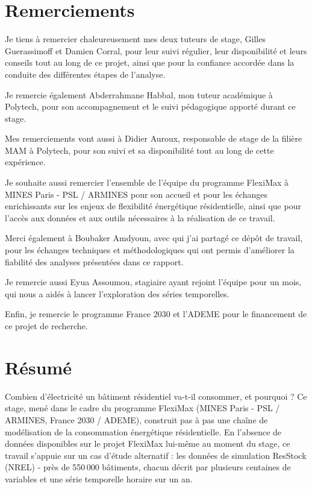 \chapter*{Remerciements}

Je tiens à remercier chaleureusement mes deux tuteurs de stage, Gilles Guerassimoff et
Damien Corral, pour leur suivi régulier, leur disponibilité et leurs conseils tout au
long de ce projet, ainsi que pour la confiance accordée dans la conduite des différentes étapes
de l'analyse.

Je remercie également Abderrahmane Habbal, mon tuteur académique à Polytech, pour
son accompagnement et le suivi pédagogique apporté durant ce stage.

Mes remerciements vont aussi à Didier Auroux, responsable de stage de la
filière MAM à Polytech, pour son suivi et sa disponibilité tout au long
de cette expérience.

Je souhaite aussi remercier l'ensemble de l'équipe du programme FlexiMax à MINES Paris - PSL /
ARMINES pour son accueil et pour les échanges enrichissants sur les enjeux de flexibilité
énergétique résidentielle, ainsi que pour l'accès aux données et aux outils nécessaires à la
réalisation de ce travail.

Merci également à Boubaker Amdyoun, avec qui j'ai partagé ce dépôt de travail, pour les échanges
techniques et méthodologiques qui ont permis d'améliorer la fiabilité des analyses présentées
dans ce rapport.

Je remercie aussi Eyua Assoumou, stagiaire ayant rejoint l'équipe pour un mois, qui nous a aidés à
lancer l'exploration des séries temporelles.

Enfin, je remercie le programme France 2030 et l'ADEME pour le financement de ce projet de
recherche.

\chapter*{Résumé}

Combien d'électricité un bâtiment résidentiel va-t-il consommer, et pourquoi ? Ce
stage, mené dans le cadre du programme FlexiMax (MINES Paris - PSL / ARMINES, France 2030 /
ADEME), construit pas à pas une chaîne de modélisation de la consommation énergétique
résidentielle. En l'absence de données disponibles sur le projet FlexiMax lui-même au moment du
stage, ce travail s'appuie sur un cas d'étude alternatif : les données de simulation ResStock
(NREL) - près de 550\,000 bâtiments, chacun décrit par plusieurs centaines de variables et une
série temporelle horaire sur un an.

